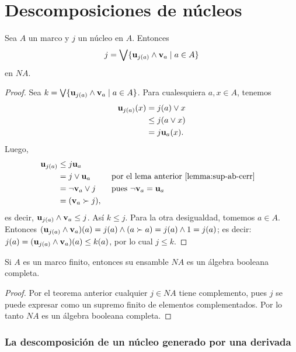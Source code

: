 \section{Descomposiciones de núcleos}

\begin{theorem}
  Sea $A$ un marco y $j$ un núcleo en $A$.
  Entonces
  \[
    j = \bigvee\{ \mathbf u_{j(a)}\wedge\mathbf v_{a} \mid a\in A\}
  \]
  en $NA$.
\end{theorem}
\begin{proof}
Sea $k=\bigvee\{\mathbf u_{j(a)}\wedge \mathbf v_{a}\mid a\in A\}$.
Para cualesquiera $a,x\in A$, tenemos
\begin{align*}
  \mathbf u_{j(a)}(x)
  &= j(a)\vee x \\
  &\leq j(a \vee x) \\
  &= j\mathbf u_{a}(x).
\end{align*}
Luego, 
\begin{align*}
  \mathbf u_{j(a)}
  &\leq j\mathbf u_{a} \\
  &= j\vee \mathbf u_{a} && \text{ por el lema anterior
  \ref{lemma:sup-ab-cerr}} \\
  &= \neg \mathbf v_{a} \vee j
    && \text{ pues } \neg\mathbf v_{a} = \mathbf u_{a} \\
  &= (\mathbf v_{a} \succ j),
\end{align*}
es decir, $\mathbf u_{j(a)} \wedge \mathbf v_{a} \leq j$.
Así $k\leq j$.
Para la otra desigualdad, tomemos $a\in A$.
Entonces $(\mathbf u_{j(a)}\wedge \mathbf v_{a})(a)=j(a)\wedge (a\succ a)=j(a)\wedge 1=j(a)$;
es decir: $j(a)=(\mathbf u_{j(a)}\wedge \mathbf v_{a})(a)\leq k(a)$,
por lo cual $j\leq k$.
\end{proof}

\begin{corollary}
  Si $A$ es un marco finito, entonces su ensamble $NA$ es un
  álgebra booleana completa.
\end{corollary}
\begin{proof}
Por el teorema anterior cualquier $j\in NA$ tiene complemento, pues $j$ se puede expresar como un supremo finito de elementos complementados. Por lo tanto $NA$ es un álgebra booleana completa.
\end{proof}


\subsubsection{La descomposición de un núcleo generado por una derivada}

